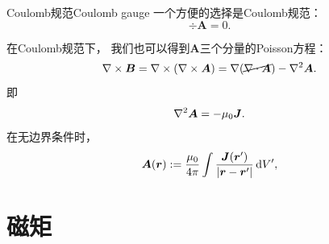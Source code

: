 \begin{definition}
    {Coulomb规范}{Coulomb gauge}
    一个方便的选择是Coulomb规范：
    \begin{equation}
        \div\bm A = 0.
    \end{equation}
\end{definition}

\begin{corollary}
    在Coulomb规范下，
    我们也可以得到$\bm A$三个分量的Poisson方程：
    \[
        \nabla\times\bm B = \nabla\times(\nabla\times\bm A) = \nabla(\cancel{\nabla\cdot\bm A}) - \nabla^2\bm A.
    \]
    即
    \begin{equation}
        \nabla^2\bm A = -\mu_0\bm J.
    \end{equation}
    在无边界条件时，
    \begin{equation}
        \label{eqn:A-J}
        \bm A(\bm r) := \frac{\mu_0}{4\pi}\int\frac{\bm J(\bm r')}{\lvert\bm r - \bm r'\rvert}\mathop{}\!\mathrm{d} V',
    \end{equation}
\end{corollary}

\section{磁矩}
\label{sec:magnetic moment}

